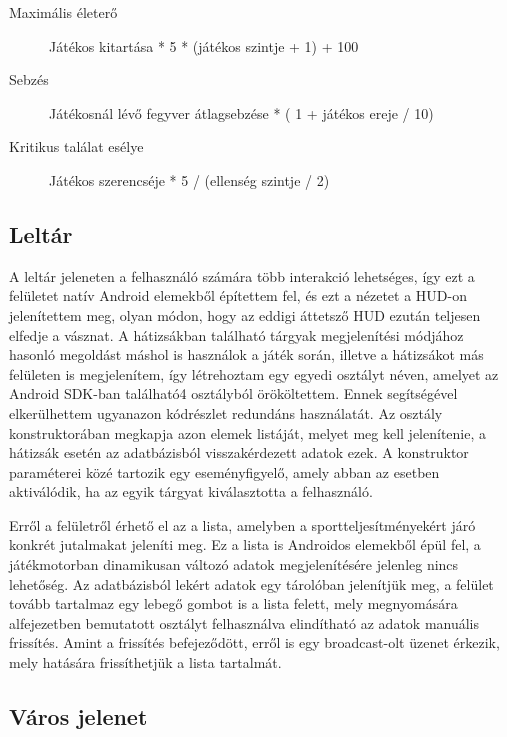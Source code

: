 \begin{description}
	\item [Maximális életerő] Játékos kitartása * 5 * (játékos szintje + 1) + 100
	\item [Sebzés] Játékosnál lévő fegyver átlagsebzése * ( 1 + játékos ereje / 10)
	\item [Kritikus találat esélye] Játékos szerencséje * 5 / (ellenség szintje / 2)
\end{description}

\subsection*{Leltár}
\label{inventory}
A leltár jeleneten a felhasználó számára több interakció lehetséges, így ezt a felületet natív Android elemekből építettem fel, és ezt a nézetet a HUD-on jelenítettem meg, olyan módon, hogy az eddigi áttetsző HUD ezután teljesen elfedje a vásznat. 
A hátizsákban található tárgyak megjelenítési módjához hasonló megoldást máshol is használok a játék során, illetve a hátizsákot más felületen is megjelenítem, így létrehoztam egy egyedi osztályt  néven, amelyet az Android SDK-ban található4  osztályból örököltettem. 
Ennek segítségével elkerülhettem ugyanazon kódrészlet redundáns használatát. 
Az osztály konstruktorában megkapja azon elemek listáját, melyet meg kell jelenítenie, a hátizsák esetén az adatbázisból visszakérdezett adatok ezek.
A konstruktor paraméterei közé tartozik egy eseményfigyelő, amely abban az esetben aktiválódik, ha az egyik tárgyat kiválasztotta a felhasználó.

Erről a felületről érhető el az a lista, amelyben a sportteljesítményekért járó konkrét jutalmakat jeleníti meg. 
Ez a lista is Androidos elemekből épül fel, a játékmotorban dinamikusan változó adatok megjelenítésére jelenleg nincs lehetőség. 
Az adatbázisból lekért adatok egy  tárolóban jelenítjük meg, a felület tovább tartalmaz egy lebegő gombot is a lista felett, mely megnyomására  alfejezetben bemutatott  osztályt felhasználva elindítható az adatok manuális frissítés. 
Amint a frissítés befejeződött, erről is egy broadcast-olt üzenet érkezik, mely hatására frissíthetjük a lista tartalmát. 

\subsection*{Város jelenet}
\label{varos}

